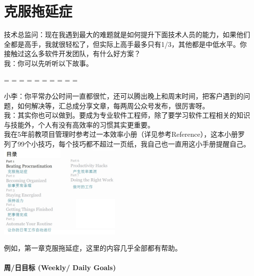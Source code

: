 \chapter{克服拖延症} %


技术总监问：现在我遇到最大的难题就是如何提升下面技术人员的能力，如果他们全都是高手，我就很轻松了，但实际上高手最多只有1/3，其他都是中低水平。你接触过这么多软件开发团队，有什么好方案？\\
我：你可以先听听以下故事。\\

\begin{description}
\tightlist
\item[]
= = = = = = = = = =
\end{description}

小李：你平常办公时间一直都很忙，还可以腾出晚上和周末时间，把客户遇到的问题，如何解决等，汇总成分享文章，每两周公众号发布，很厉害呀。\\
我：其实你也可以做到。要成为专业软件工程师，除了要学习软件工程相关的知识与技能外，个人有没有高效率的习惯其实更重要。\\
我在5年前教项目管理时参考过一本效率小册（详见参考Reference），这本小册罗列了99个小技巧，每个技巧都不超过一页纸，我自己也一直用这小手册提醒自己。\\ 


\includegraphics[width=6cm]{Screenshotfrom2023-10-1523-05-0011.jpg}

例如，第一章克服拖延症，这里的内容几乎全部都有帮助。\\



\hypertarget{ux6839ux56e0ux5206ux6790ux8befux89e3ux6848ux4f8b}{%
\subsubsection{周/日目标 (Weekly/ Daily Goals)}\label{ux6839ux56e0ux5206ux6790ux8befux89e3ux6848ux4f8b}}

